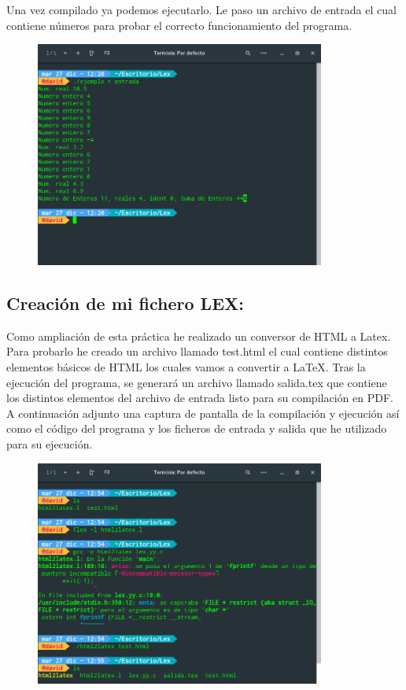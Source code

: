 \documentclass[10pt,a4paper,spanish]{report}
\begin{document}
\noindent
Una vez compilado ya podemos ejecutarlo. Le paso un archivo de entrada el cual contiene números para probar el correcto funcionamiento del programa.

\begin{figure}[!hbp]
	\centering  \includegraphics[width=0.85\textwidth]{Imagenes/Ejercicio4-2.png}
\end{figure}

\newpage
\subsection{Creación de mi fichero LEX:}

\noindent
Como ampliación de esta práctica he realizado un conversor de HTML a Latex. Para probarlo he creado un archivo llamado test.html el cual contiene distintos elementos básicos de HTML los cuales vamos a convertir a LaTeX. Tras la ejecución del programa, se generará un archivo llamado salida.tex que contiene los distintos elementos del archivo de entrada listo para su compilación en PDF. \\

\noindent
A continuación adjunto una captura de pantalla de la compilación y ejecución así como el código del programa y los ficheros de entrada y salida que he utilizado para su ejecución.

\begin{figure}[!hbp]
	\centering  \includegraphics[width=0.85\textwidth]{Imagenes/Ejercicio4-3.png}
\end{figure}
\end{document}
